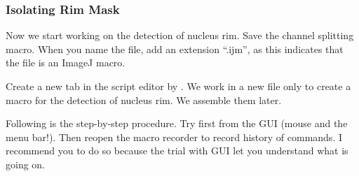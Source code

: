
\subsubsection{Isolating Rim Mask}

Now we start working on the detection of nucleus rim. Save the channel splitting macro. When you name the file, add an extension ``.ijm'', as this indicates that the file is an ImageJ macro.

Create a new tab in the script editor by . We work in a new file only to create a macro for the detection of nucleus rim. We assemble them later.

Following is the step-by-step procedure. Try first from the GUI (mouse and the menu bar!). Then reopen the macro recorder to record history of commands. I recommend you to do so because the trial with GUI let you understand what is going on.

